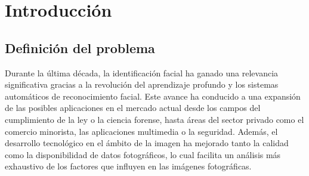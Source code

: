 \chapter{Introducción}
\thispagestyle{empty}

\section{Definición del problema}



Durante la última década, la identificación facial ha ganado una relevancia significativa gracias a la revolución del aprendizaje profundo y los sistemas automáticos de reconocimiento facial. Este avance ha conducido a una expansión de las posibles aplicaciones en el mercado actual desde los campos del cumplimiento de la ley o la ciencia forense, hasta áreas del sector privado como el comercio minorista, las aplicaciones multimedia o la seguridad. Además, el desarrollo tecnológico en el ámbito de la imagen ha mejorado tanto la calidad como la disponibilidad de datos fotográficos, lo cual facilita un análisis más exhaustivo de los factores que influyen en las imágenes fotográficas.

